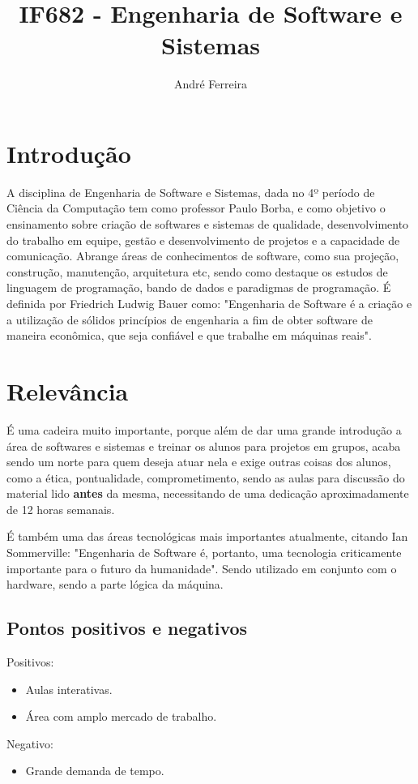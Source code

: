 \documentclass[a4paper]{article}
\title{IF682 - Engenharia de Software e Sistemas}
\author{André Ferreira}
\begin{document}
\maketitle
\section{Introdução}
A disciplina de Engenharia de Software e Sistemas, dada no 4º período de Ciência da Computação tem como professor Paulo Borba, e como objetivo o ensinamento sobre criação de softwares e sistemas de qualidade, desenvolvimento do trabalho em equipe, gestão e desenvolvimento de projetos e a capacidade de comunicação. Abrange áreas de conhecimentos de software, como sua projeção, construção, manutenção, arquitetura etc, sendo como destaque os estudos de linguagem de programação, bando de dados e paradigmas de programação. É definida por Friedrich Ludwig Bauer como: "Engenharia de Software é a criação e a utilização de sólidos princípios de engenharia a fim de obter software de maneira econômica, que seja confiável e que trabalhe em máquinas reais".

\section{Relevância}
 É uma cadeira muito importante, porque além de dar uma grande introdução a área de softwares e sistemas e treinar os alunos para projetos em grupos, acaba sendo um norte para quem deseja atuar nela e exige outras coisas dos alunos, como a ética, pontualidade, comprometimento, sendo as aulas para discussão do material lido \textbf{antes} da mesma, necessitando de uma dedicação aproximadamente de 12 horas semanais\cite{slides}.

É também uma das áreas tecnológicas mais importantes atualmente, citando Ian Sommerville: "Engenharia de Software é, portanto, uma tecnologia criticamente importante para o futuro da humanidade"\cite{Ian}. Sendo utilizado em conjunto com o hardware, sendo a parte lógica da máquina.

\subsection{Pontos positivos e negativos}

\begin{multicols}{2}
    \huge Positivos:
    \large
\begin{itemize}
    \item Aulas interativas.
    \item Área com amplo mercado de trabalho.\cite{market}
\end{itemize}
\columnbreak
    \huge Negativo:
    \large
\begin{itemize}
    \item Grande demanda de tempo.
\end{itemize}
\end{multicols}
\end{document}
